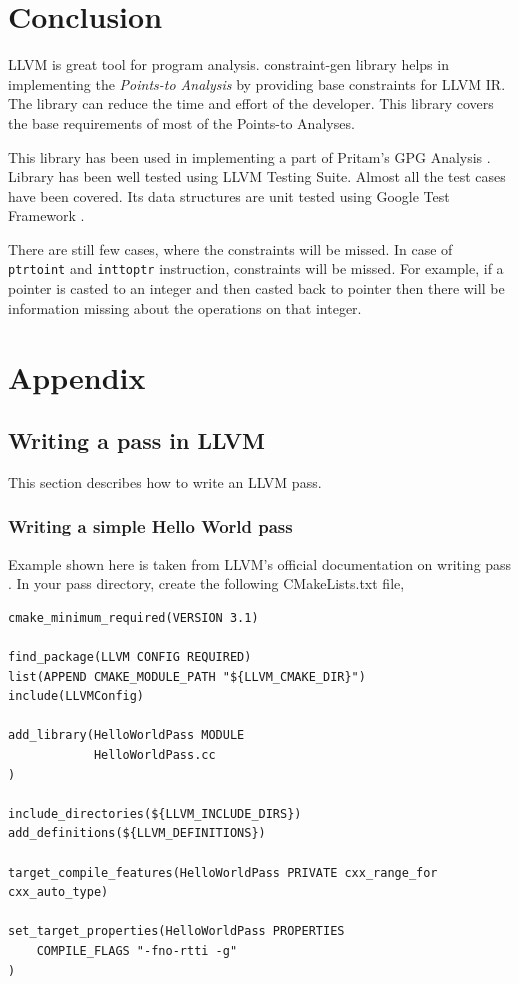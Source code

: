 \documentclass[a4paper,12pt]{report}
\begin{document}
\chapter{Conclusion}
LLVM is great tool for program analysis. 
constraint-gen library helps in implementing the \textit{Points-to Analysis} by
providing base constraints for LLVM IR. The library can reduce the time and effort
of the developer. This library covers the base requirements of most of the
Points-to Analyses.

This library has been used in implementing a part of Pritam's GPG Analysis
\cite{Pritams}. Library has been well tested using LLVM Testing Suite.
Almost all the test cases have been covered. Its data structures are unit
tested using Google Test Framework \cite{Gtest}.

There are still few cases, where the constraints will be missed.
In case of \texttt{ptrtoint} and \texttt{inttoptr} instruction, constraints
will be missed. For example, if a pointer is casted to an integer and then casted
back to pointer then there will be information missing about the operations on that
integer.

\chapter{Appendix}
\appendix

\section{Writing a pass in LLVM}
This section describes how to write an LLVM pass.

\subsection{Writing a simple Hello World pass}
Example shown here is taken from LLVM's official documentation on writing pass \cite{llvm-pass}. 
In your pass directory, create the following CMakeLists.txt file,

\begin{verbatim}
cmake_minimum_required(VERSION 3.1)

find_package(LLVM CONFIG REQUIRED)
list(APPEND CMAKE_MODULE_PATH "${LLVM_CMAKE_DIR}")
include(LLVMConfig)

add_library(HelloWorldPass MODULE
            HelloWorldPass.cc
)

include_directories(${LLVM_INCLUDE_DIRS})
add_definitions(${LLVM_DEFINITIONS})

target_compile_features(HelloWorldPass PRIVATE cxx_range_for cxx_auto_type)

set_target_properties(HelloWorldPass PROPERTIES
    COMPILE_FLAGS "-fno-rtti -g"
)
\end{verbatim}
\end{document}
